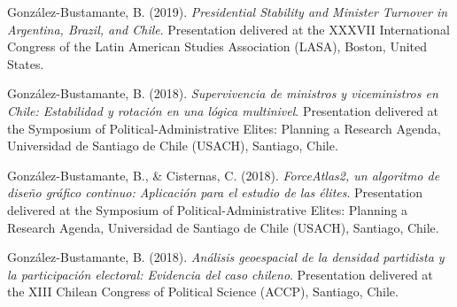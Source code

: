 \begin{publications}
\begin{benumerate}{87}
\item{González-Bustamante, B. (2019). {\itshape Presidential Stability and Minister Turnover in Argentina, Brazil, and Chile}. Presentation delivered at the XXXVII International Congress of the Latin American Studies Association (LASA), Boston, United States.}\vspace{1mm}


\item{González-Bustamante, B. (2018). {\itshape Supervivencia de ministros y viceministros en Chile: Estabilidad y rotación en una lógica multinivel}. Presentation delivered at the Symposium of Political-Administrative Elites: Planning a Research Agenda, Universidad de Santiago de Chile (USACH), Santiago, Chile.}\vspace{1mm}


\item{González-Bustamante, B., \& Cisternas, C. (2018). {\itshape ForceAtlas2, un algoritmo de diseño gráfico continuo: Aplicación para el estudio de las élites}. Presentation delivered at the Symposium of Political-Administrative Elites: Planning a Research Agenda, Universidad de Santiago de Chile (USACH), Santiago, Chile.}\vspace{1mm}


\item{González-Bustamante, B. (2018). {\itshape Análisis geoespacial de la densidad partidista y la participación electoral: Evidencia del caso chileno}. Presentation delivered at the XIII Chilean Congress of Political Science (ACCP), Santiago, Chile.}\vspace{1mm}


\end{benumerate}
\end{publications}
